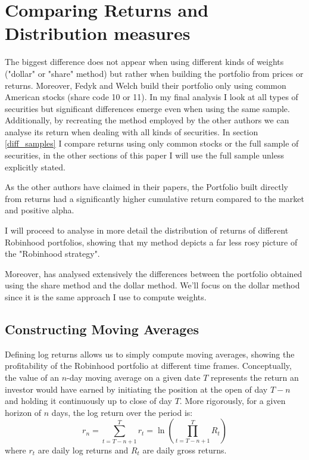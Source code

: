 
\section{Comparing Returns and Distribution measures}\label{return_section}
The biggest difference does not appear when using different kinds of weights ("dollar" or "share" method) but rather when building the portfolio from prices or returns. 
Moreover, Fedyk and Welch build their portfolio only using common American stocks (share code 10 or 11). 
In my final analysis I look at all types of securities but significant differences emerge even when using the same sample. 
Additionally, by recreating the method employed by the other authors we can analyse its return when dealing with all kinds of securities. 
In section \ref{diff_samples} I compare returns using only common stocks or the full sample of securities, in the other sections of this paper I will use the full sample unless explicitly stated.

As the other authors have claimed in their papers, the Portfolio built directly from returns had a significantly higher cumulative return compared to the market and positive alpha.

I will proceed to analyse in more detail the distribution of returns of different Robinhood portfolios, showing that my method depicts a far less rosy picture of the "Robinhood strategy".

Moreover, \cite{Fedyk2024} has analysed extensively the differences between the portfolio obtained using the share method and the dollar method. 
We'll focus on the dollar method since it is the same approach I use to compute weights.

\subsection{Constructing Moving Averages}
Defining log returns allows us to simply compute moving averages, showing the profitability of the Robinhood portfolio at different time frames.
Conceptually, the value of an $n$-day moving average on a given date $T$ represents the return an investor would have earned by initiating the position at the open of day $T-n$ and holding it continuously up to close of day $T$.
More rigorously, for a given horizon of $n$ days, the log return over the period is:
\begin{equation}
    r_n = \sum_{t=T-n+1}^{T} r_t = \ln \left( \prod_{t=T-n+1}^{T} R_t \right)
\end{equation}
where $r_t$ are daily log returns and $R_t$ are daily gross returns.



